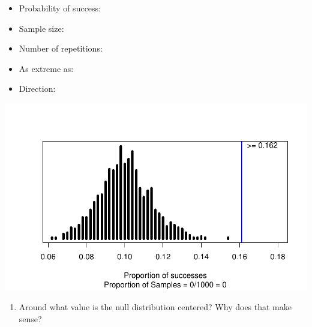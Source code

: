 \documentclass[
]{report}
\providecommand{\tightlist}{%
  \setlength{\itemsep}{0pt}\setlength{\parskip}{0pt}}
\begin{document}
\vspace{.2in}

\begin{itemize}
\tightlist
\item
  Probability of success:
\end{itemize}

\vspace{.2in}

\begin{itemize}
\tightlist
\item
  Sample size:
\end{itemize}

\vspace{.2in}

\begin{itemize}
\tightlist
\item
  Number of repetitions:
\end{itemize}

\vspace{.2in}

\begin{itemize}
\tightlist
\item
  As extreme as:
\end{itemize}

\vspace{.2in}

\begin{itemize}
\tightlist
\item
  Direction:
\end{itemize}

\vspace{.2in}

\begin{center}\includegraphics[width=0.7\linewidth]{06-inference-1cat_files/figure-latex/unnamed-chunk-4-1} \end{center}

\begin{enumerate}
\def\labelenumi{\arabic{enumi}.}
\setcounter{enumi}{18}
\tightlist
\item
  Around what value is the null distribution centered? Why does that make sense?
\end{enumerate}
\end{document}
